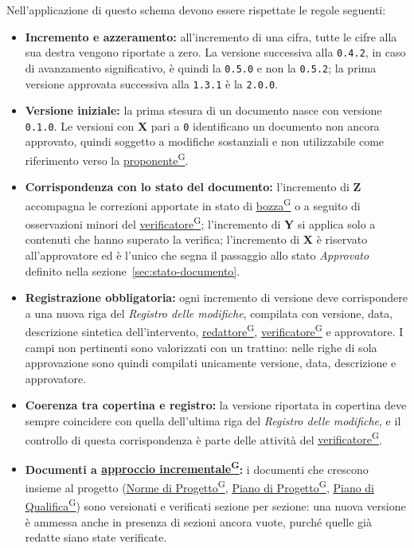 \documentclass[a4paper,12pt]{article}
\providecommand{\glslink}[2]{\href{https://alittlebyte-19.github.io/Documentazione/glossario.html\#gls-#1}{\underline{#2}\textsuperscript{\scriptsize G}}}
\begin{document}
Nell'applicazione di questo schema devono essere rispettate le regole seguenti:

\begin{itemize}
    \item \textbf{Incremento e azzeramento:} all'incremento di una cifra, tutte le cifre alla sua destra vengono riportate a zero. La versione successiva alla \texttt{0.4.2}, in caso di avanzamento significativo, è quindi la \texttt{0.5.0} e non la \texttt{0.5.2}; la prima versione approvata successiva alla \texttt{1.3.1} è la \texttt{2.0.0}.
    \item \textbf{Versione iniziale:} la prima stesura di un documento nasce con versione \texttt{0.1.0}. Le versioni con \textbf{X} pari a \texttt{0} identificano un documento non ancora approvato, quindi soggetto a modifiche sostanziali e non utilizzabile come riferimento verso la \glslink{committente-proponente}{proponente}.
    \item \textbf{Corrispondenza con lo stato del documento:} l'incremento di \textbf{Z} accompagna le correzioni apportate in stato di \glslink{bozza-draft}{bozza} o a seguito di osservazioni minori del \glslink{verificatore}{verificatore}; l'incremento di \textbf{Y} si applica solo a contenuti che hanno superato la verifica; l'incremento di \textbf{X} è riservato all'approvatore ed è l'unico che segna il passaggio allo stato \textit{Approvato} definito nella sezione~\ref{sec:stato-documento}.
    \item \textbf{Registrazione obbligatoria:} ogni incremento di versione deve corrispondere a una nuova riga del \textit{Registro delle modifiche}, compilata con versione, data, descrizione sintetica dell'intervento, \glslink{redattore}{redattore}, \glslink{verificatore}{verificatore} e approvatore. I campi non pertinenti sono valorizzati con un trattino: nelle righe di sola approvazione sono quindi compilati unicamente versione, data, descrizione e approvatore.
    \item \textbf{Coerenza tra copertina e registro:} la versione riportata in copertina deve sempre coincidere con quella dell'ultima riga del \textit{Registro delle modifiche}, e il controllo di questa corrispondenza è parte delle attività del \glslink{verificatore}{verificatore}.
    \item \textbf{Documenti a \glslink{approccio-incrementale}{approccio incrementale}:} i documenti che crescono insieme al progetto (\glslink{norme-di-progetto}{Norme di Progetto}, \glslink{piano-di-progetto}{Piano di Progetto}, \glslink{piano-di-qualifica}{Piano di Qualifica}) sono versionati e verificati sezione per sezione: una nuova versione è ammessa anche in presenza di sezioni ancora vuote, purché quelle già redatte siano state verificate.
\end{itemize}
\end{document}
